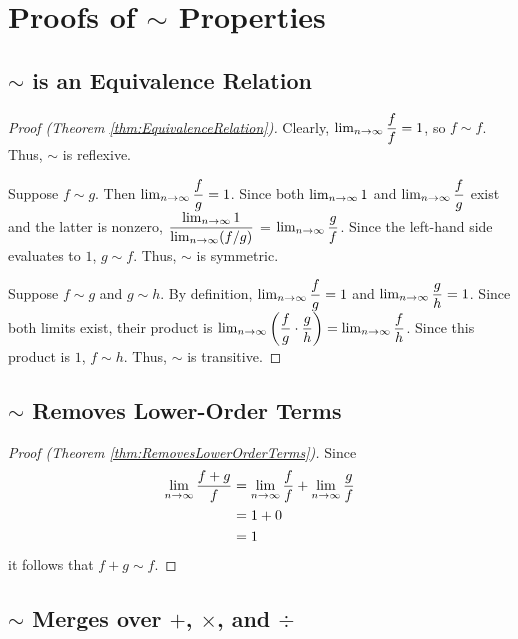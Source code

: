 \appendix
\appendixpage

\section{Proofs of $\sim$ Properties}

\subsection{$\sim$ is an Equivalence Relation}

\begin{proof}[Proof (Theorem \ref{thm:EquivalenceRelation})]
	Clearly, $\lim_{n \to \infty} \dfrac{f}{f} = 1$, so $f \sim f$. Thus, $\sim$ is reflexive.
	
	Suppose $f \sim g$. Then $\lim_{n \to \infty} \dfrac{f}{g} = 1$. Since both $\lim_{n \to \infty} 1$ and $\lim_{n \to \infty} \dfrac{f}{g}$ exist and the latter is nonzero, $\dfrac{\lim_{n \to \infty} 1}{\lim_{n \to \infty} (f / g)}$ = $\lim_{n \to \infty} \dfrac{g}{f}$. Since the left-hand side evaluates to $1$, $g \sim f$. Thus, $\sim$ is symmetric.
	
	Suppose $f \sim g$ and $g \sim h$. By definition, $\lim_{n \to \infty} \dfrac{f}{g} = 1$ and $\lim_{n \to \infty} \dfrac{g}{h} = 1$. Since both limits exist, their product is $\lim_{n \to \infty} \left( \dfrac{f}{g} \cdot \dfrac{g}{h} \right) = \lim_{n \to \infty} \dfrac{f}{h}$. Since this product is $1$, $f \sim h$. Thus, $\sim$ is transitive.
\end{proof}

\subsection{$\sim$ Removes Lower-Order Terms}

\begin{proof}[Proof (Theorem \ref{thm:RemovesLowerOrderTerms})]
	Since
	\begin{align*}
	\lim_{n \to \infty} \frac{f + g}{f} &= \lim_{n \to \infty} \frac{f}{f} + \lim_{n \to \infty} \frac{g}{f}\\
	&= 1 + 0\\
	&= 1
	\end{align*}
	it follows that $f + g \sim f$.
\end{proof}

\subsection{$\sim$ Merges over $+$, $\times$, and $\div$}


